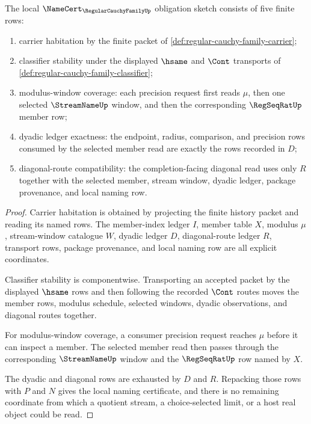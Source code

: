 \begin{theorem}
\label{thm:regular-cauchy-family-namecert-obligations}
The local $\NameCert_{\RegularCauchyFamilyUp}$ obligation sketch consists of five finite rows:
\begin{enumerate}
\item carrier habitation by the finite packet of \autoref{def:regular-cauchy-family-carrier};
\item classifier stability under the displayed $\hsame$ and $\Cont$ transports of \autoref{def:regular-cauchy-family-classifier};
\item modulus-window coverage: each precision request first reads $\mu$, then one selected $\StreamNameUp$ window, and then the corresponding $\RegSeqRatUp$ member row;
\item dyadic ledger exactness: the endpoint, radius, comparison, and precision rows consumed by the selected member read are exactly the rows recorded in $D$;
\item diagonal-route compatibility: the completion-facing diagonal read uses only $R$ together with the selected member, stream window, dyadic ledger, package provenance, and local naming row.
\end{enumerate}
\end{theorem}
\begin{proof}
Carrier habitation is obtained by projecting the finite history packet and reading its named rows. The member-index ledger $I$, member table $X$, modulus $\mu$, stream-window catalogue $W$, dyadic ledger $D$, diagonal-route ledger $R$, transport rows, package provenance, and local naming row are all explicit coordinates.

Classifier stability is componentwise. Transporting an accepted packet by the displayed $\hsame$ rows and then following the recorded $\Cont$ routes moves the member rows, modulus schedule, selected windows, dyadic observations, and diagonal routes together.

For modulus-window coverage, a consumer precision request reaches $\mu$ before it can inspect a member. The selected member read then passes through the corresponding $\StreamNameUp$ window and the $\RegSeqRatUp$ row named by $X$.

The dyadic and diagonal rows are exhausted by $D$ and $R$. Repacking those rows with $P$ and $N$ gives the local naming certificate, and there is no remaining coordinate from which a quotient stream, a choice-selected limit, or a host real object could be read.
\end{proof}


